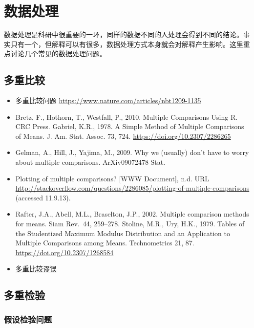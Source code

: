 \documentclass[]{tufte-book}
\begin{document}
\hypertarget{data}{%
\chapter{数据处理}\label{data}}

数据处理是科研中很重要的一环，同样的数据不同的人处理会得到不同的结论。事实只有一个，但解释可以有很多，数据处理方式本身就会对解释产生影响。这里重点讨论几个常见的数据处理问题。

\hypertarget{ux591aux91cdux6bd4ux8f83}{%
\section{多重比较}\label{ux591aux91cdux6bd4ux8f83}}

\begin{itemize}
\item
  多重比较问题 \url{https://www.nature.com/articles/nbt1209-1135}
\item
  Bretz, F., Hothorn, T., Westfall, P., 2010. Multiple Comparisons Using R. CRC Press.
  Gabriel, K.R., 1978. A Simple Method of Multiple Comparisons of Means. J. Am. Stat. Assoc. 73, 724. \url{https://doi.org/10.2307/2286265}
\item
  Gelman, A., Hill, J., Yajima, M., 2009. Why we (usually) don't have to worry about multiple comparisons. ArXiv09072478 Stat.
\item
  Plotting of multiple comparisons? {[}WWW Document{]}, n.d. URL \url{http://stackoverflow.com/questions/2286085/plotting-of-multiple-comparisons} (accessed 11.9.13).
\item
  Rafter, J.A., Abell, M.L., Braselton, J.P., 2002. Multiple comparison methods for means. Siam Rev.~44, 259--278.
  Stoline, M.R., Ury, H.K., 1979. Tables of the Studentized Maximum Modulus Distribution and an Application to Multiple Comparisons among Means. Technometrics 21, 87. \url{https://doi.org/10.2307/1268584}
\item
  \href{https://zh.wikipedia.org/wiki/\%E5\%A4\%9A\%E9\%87\%8D\%E6\%AF\%94\%E8\%BC\%83\%E8\%AC\%AC\%E8\%AA\%A4}{多重比较谬误}
\end{itemize}

\hypertarget{ux591aux91cdux68c0ux9a8c}{%
\section{多重检验}\label{ux591aux91cdux68c0ux9a8c}}

\hypertarget{ux5047ux8bbeux68c0ux9a8cux95eeux9898}{%
\subsection{假设检验问题}\label{ux5047ux8bbeux68c0ux9a8cux95eeux9898}}
\end{document}
